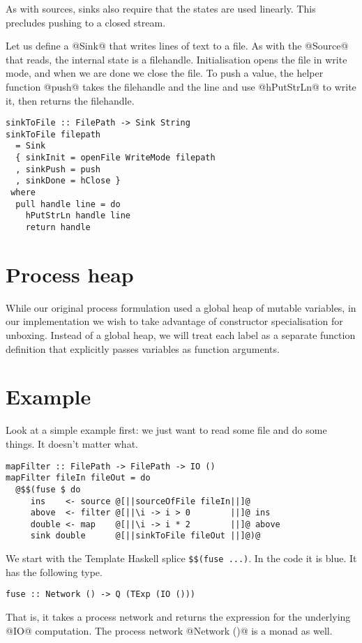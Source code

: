 As with sources, sinks also require that the states are used linearly.
This precludes pushing to a closed stream.

Let us define a @Sink@ that writes lines of text to a file.
As with the @Source@ that reads, the internal state is a filehandle.
Initialisation opens the file in write mode, and when we are done we close the file.
To push a value, the helper function @push@ takes the filehandle and the line and use @hPutStrLn@ to write it, then returns the filehandle.

\begin{lstlisting}
sinkToFile :: FilePath -> Sink String
sinkToFile filepath
  = Sink
  { sinkInit = openFile WriteMode filepath
  , sinkPush = push
  , sinkDone = hClose }
 where
  pull handle line = do
    hPutStrLn handle line
    return handle
\end{lstlisting}


\section{Process heap}
While our original process formulation  used a global heap of mutable variables, in our implementation we wish to take advantage of constructor specialisation for unboxing.
Instead of a global heap, we will treat each label as a separate function definition that explicitly passes variables as function arguments.


\section{Example}

Look at a simple example first: we just want to read some file and do some things.
It doesn't matter what.
\begin{lstlisting}
mapFilter :: FilePath -> FilePath -> IO ()
mapFilter fileIn fileOut = do
  @$$(fuse $ do
     ins    <- source @[||sourceOfFile fileIn||]@
     above  <- filter @[||\i -> i > 0        ||]@ ins
     double <- map    @[||\i -> i * 2        ||]@ above
     sink double      @[||sinkToFile fileOut ||]@)@
\end{lstlisting}

We start with the Template Haskell splice \verb/$$(fuse ...)/. In the code it is blue. 
It has the following type.
\begin{lstlisting}
fuse :: Network () -> Q (TExp (IO ()))
\end{lstlisting}
That is, it takes a process network and returns the expression for the underlying @IO@ computation.
The process network @Network ()@ is a monad as well.

